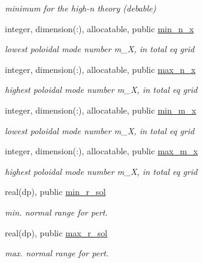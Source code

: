 \begin{DoxyCompactItemize}
\begin{DoxyCompactList}\small\item\em minimum for the high-\/n theory (debable) \end{DoxyCompactList}\item 
integer, dimension(\+:), allocatable, public \hyperlink{namespacex__vars_a07485e5ebf54c236ae6f3c25e9cd2a93}{min\+\_\+n\+\_\+x}
\begin{DoxyCompactList}\small\item\em lowest poloidal mode number {\ttfamily m\+\_\+X}, in total eq grid \end{DoxyCompactList}\item 
integer, dimension(\+:), allocatable, public \hyperlink{namespacex__vars_a2f04400f8c1489db3f2d66fa972852a5}{max\+\_\+n\+\_\+x}
\begin{DoxyCompactList}\small\item\em highest poloidal mode number {\ttfamily m\+\_\+X}, in total eq grid \end{DoxyCompactList}\item 
integer, dimension(\+:), allocatable, public \hyperlink{namespacex__vars_aae62c7b4f8043dcccad97454b5857690}{min\+\_\+m\+\_\+x}
\begin{DoxyCompactList}\small\item\em lowest poloidal mode number {\ttfamily m\+\_\+X}, in total eq grid \end{DoxyCompactList}\item 
integer, dimension(\+:), allocatable, public \hyperlink{namespacex__vars_aad66540f255243f66887442b9ef3c745}{max\+\_\+m\+\_\+x}
\begin{DoxyCompactList}\small\item\em highest poloidal mode number {\ttfamily m\+\_\+X}, in total eq grid \end{DoxyCompactList}\item 
real(dp), public \hyperlink{namespacex__vars_a50c610efcf5afa4ec4b0eb7119b5d520}{min\+\_\+r\+\_\+sol}
\begin{DoxyCompactList}\small\item\em min. normal range for pert. \end{DoxyCompactList}\item 
real(dp), public \hyperlink{namespacex__vars_a0f45dfddb928623424eeb8b8bdd2b0f9}{max\+\_\+r\+\_\+sol}
\begin{DoxyCompactList}\small\item\em max. normal range for pert. \end{DoxyCompactList}\item 

\end{DoxyCompactItemize}
